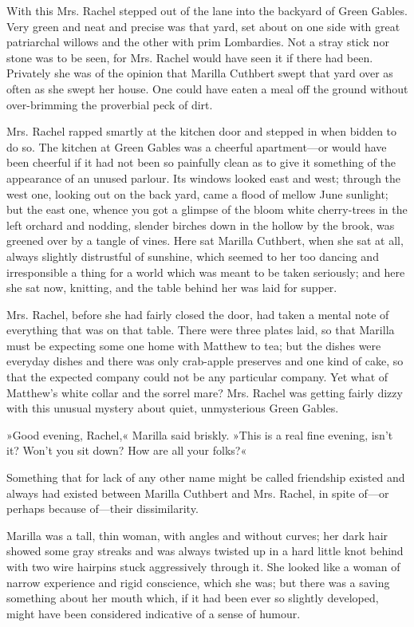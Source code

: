 With this Mrs. Rachel stepped out of the lane into the backyard of Green Gables. Very green and neat and precise was that yard, set about on one side with great patriarchal willows and the other with prim Lombardies. Not a stray stick nor stone was to be seen, for Mrs. Rachel would have seen it if there had been. Privately she was of the opinion that Marilla Cuthbert swept that yard over as often as she swept her house. One could have eaten a meal off the ground without over-brimming the proverbial peck of dirt.

Mrs. Rachel rapped smartly at the kitchen door and stepped in when bidden to do so. The kitchen at Green Gables was a cheerful apartment—or would have been cheerful if it had not been so painfully clean as to give it something of the appearance of an unused parlour. Its windows looked east and west; through the west one, looking out on the back yard, came a flood of mellow June sunlight; but the east one, whence you got a glimpse of the bloom white cherry-trees in the left orchard and nodding, slender birches down in the hollow by the brook, was greened over by a tangle of vines. Here sat Marilla Cuthbert, when she sat at all, always slightly distrustful of sunshine, which seemed to her too dancing and irresponsible a thing for a world which was meant to be taken seriously; and here she sat now, knitting, and the table behind her was laid for supper.

Mrs. Rachel, before she had fairly closed the door, had taken a mental note of everything that was on that table. There were three plates laid, so that Marilla must be expecting some one home with Matthew to tea; but the dishes were everyday dishes and there was only crab-apple preserves and one kind of cake, so that the expected company could not be any particular company. Yet what of Matthew’s white collar and the sorrel mare? Mrs. Rachel was getting fairly dizzy with this unusual mystery about quiet, unmysterious Green Gables.

»Good evening, Rachel,« Marilla said briskly. »This is a real fine evening, isn’t it? Won’t you sit down? How are all your folks?«

Something that for lack of any other name might be called friendship existed and always had existed between Marilla Cuthbert and Mrs. Rachel, in spite of—or perhaps because of—their dissimilarity.

Marilla was a tall, thin woman, with angles and without curves; her dark hair showed some gray streaks and was always twisted up in a hard little knot behind with two wire hairpins stuck aggressively through it. She looked like a woman of narrow experience and rigid conscience, which she was; but there was a saving something about her mouth which, if it had been ever so slightly developed, might have been considered indicative of a sense of humour.

